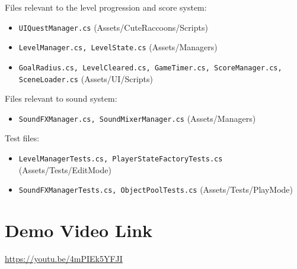 \documentclass[10pt]{final_report}
\begin{document}
Files relevant to the level progression and score system:
\begin{itemize}
    \item \texttt{UIQuestManager.cs} (Assets/CuteRaccoons/Scripts)
    \item \texttt{LevelManager.cs, LevelState.cs} (Assets/Managers)
    \item \texttt{GoalRadius.cs, LevelCleared.cs, GameTimer.cs, ScoreManager.cs, SceneLoader.cs} (Assets/UI/Scripts)
\end{itemize}

Files relevant to sound system:
\begin{itemize}
    \item \texttt{SoundFXManager.cs, SoundMixerManager.cs} (Assets/Managers)
\end{itemize}

Test files:
\begin{itemize}
    \item \texttt{LevelManagerTests.cs, PlayerStateFactoryTests.cs} (Assets/Tests/EditMode)
    \item \texttt{SoundFXManagerTests.cs, ObjectPoolTests.cs} (Assets/Tests/PlayMode)
\end{itemize}

\section{Demo Video Link}
\url{https://youtu.be/4mPIEk5YFJI}

\newpage
{}
{}

\raggedright

\end{document}
